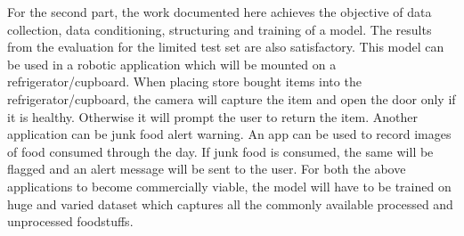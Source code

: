 \documentclass[10pt,journal,compsoc]{IEEEtran}
\begin{document}
For the second part, the work documented here achieves the objective of data collection, data conditioning, structuring and training of a model. The results from the evaluation for the limited test set are also satisfactory. This model can be used in a robotic application which will be mounted on a refrigerator/cupboard. When placing store bought items into the refrigerator/cupboard, the camera will capture the item and open the door only if it is healthy. Otherwise it will prompt the user to return the item. Another application can be junk food alert warning. An app can be used to record images of food consumed through the day. If junk food is consumed, the same will be flagged and an alert message will be sent to the user. 
For both the above applications to become commercially viable, the model will have to be trained on huge and varied dataset which captures all the commonly available processed and unprocessed foodstuffs.



\end{document}
